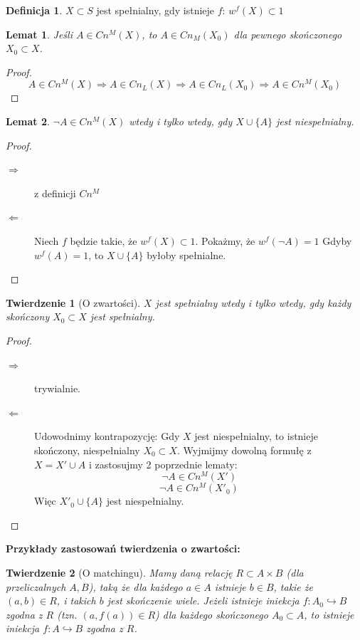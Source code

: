 \documentclass[10pt,a4paper]{article}
\theoremstyle{plain}
\newtheorem{theorem}{Twierdzenie}
\newtheorem{lemma}{Lemat}
\theoremstyle{definition}
\newtheorem*{definition}{Definicja}
\newcommand{\header}[1]{\noindent\textbf{#1}}
\begin{document}
\begin{definition}
$X \subset S$ jest spełnialny, gdy istnieje $f$: $w^f(X) \subset {1}$
\end{definition}

\begin{lemma}
Jeśli $A \in Cn^M(X)$, to $A \in Cn_M(X_0)$
dla pewnego skończonego $X_0 \subset X$.
\end{lemma}

\begin{proof}
$$A \in Cn^M(X) \Rightarrow A \in Cn_L(X)
\Rightarrow A \in Cn_L(X_0) \Rightarrow A \in Cn^M(X_0)$$
\end{proof}

\begin{lemma}
$\neg A \in Cn^M(X)$ wtedy i tylko wtedy, gdy $X \cup \{A\}$ jest niespełnialny.
\end{lemma}

\begin{proof}
	~\begin{description}
		\item[$\Rightarrow$] z definicji $Cn^M$
		\item[$\Leftarrow$] Niech $f$ będzie takie, że $w^f(X) \subset{1}$.
		Pokażmy, że $w^f(\neg A) = 1$
		Gdyby $w^f(A) = 1$, to $X \cup \{A\}$ byłoby spełnialne.
	\end{description}
\end{proof}

\begin{theorem}[O zwartości]
$X$ jest spełnialny wtedy i tylko wtedy,
gdy każdy skończony $X_0 \subset X$ jest spełnialny.
\end{theorem}

\begin{proof}
	~\begin{description}
		\item[$\Rightarrow$] trywialnie.
		\item[$\Leftarrow$] Udowodnimy kontrapozycję: Gdy $X$ jest niespełnialny,
		to istnieje skończony, niespełnialny $X_0 \subset X$.
		Wyjmijmy dowolną formułę z $X = X' \cup {A}$
		i zastosujmy 2 poprzednie lematy:
		$$\neg A \in Cn^M(X')$$
		$$\neg A \in Cn^M(X'_0)$$
		Więc $X'_0 \cup \{A\}$ jest niespełnialny.
	\end{description}
\end{proof}

\header{Przykłady zastosowań twierdzenia o zwartości:}

\begin{theorem}[O matchingu]
Mamy daną relację $R \subset A \times B$ (dla przeliczalnych $A, B$), taką że
dla każdego $a \in A$ istnieje $b \in B$, takie że $(a, b) \in R$, i takich $b$
jest skończenie wiele.
Jeżeli istnieje iniekcja $f: A_0 \hookrightarrow B$ zgodna z $R$
(tzn. $(a, f(a)) \in R$) dla każdego skończonego $A_0 \subset A$, to istnieje
iniekcja $f: A \hookrightarrow B$ zgodna z $R$.
\end{theorem}
\end{document}
